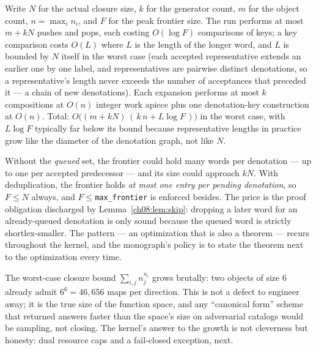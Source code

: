 \begin{remark}\label{ch08:rem:cost}
Write $N$ for the actual closure size, $k$ for the generator count, $m$ for
the object count, $n=\max_i n_i$, and $F$ for the peak frontier size. The
run performs at most $m+kN$ pushes and pops, each costing
$O(\log F)$ comparisons of keys; a key comparison costs $O(L)$ where $L$ is
the length of the longer word, and $L$ is bounded by $N$ itself in the worst
case (each accepted representative extends an earlier one by one label, and
representatives are pairwise distinct denotations, so a representative's
length never exceeds the number of acceptances that preceded it --- a chain
of new denotations). Each expansion performs at most $k$ compositions at
$O(n)$ integer work apiece plus one denotation-key construction at $O(n)$.
Total: $O\bigl((m+kN)\,(\,k\,n + L\log F\,)\bigr)$ in the worst case, with
$L\log F$ typically far below its bound because representative lengths in
practice grow like the diameter of the denotation graph, not like $N$.
\end{remark}

\begin{remark}\label{ch08:rem:frontier}
Without the \emph{queued} set, the frontier could hold many words per
denotation --- up to one per accepted predecessor --- and its size could
approach $kN$. With deduplication, the frontier holds \emph{at most one
entry per pending denotation}, so $F\le N$ always, and
$F\le{}$\texttt{max\_frontier} is enforced besides. The price is the proof
obligation discharged by Lemma~\ref{ch08:lem:skip}: dropping a later word
for an already-queued denotation is only sound because the queued word is
strictly shortlex-smaller. The pattern --- an optimization that is also a
theorem --- recurs throughout the kernel, and the monograph's policy is to
state the theorem next to the optimization every time.
\end{remark}

\begin{boundary}\label{ch08:bd:bound}
The worst-case closure bound $\sum_{i,j}n_j^{n_i}$ grows brutally: two
objects of size $6$ already admit $6^6=46{,}656$ maps per direction. This is
not a defect to engineer away; it is the true size of the function space,
and any ``canonical form'' scheme that returned answers faster than the
space's size on adversarial catalogs would be sampling, not closing. The
kernel's answer to the growth is not cleverness but honesty: dual resource
caps and a fail-closed exception, next.
\end{boundary}

